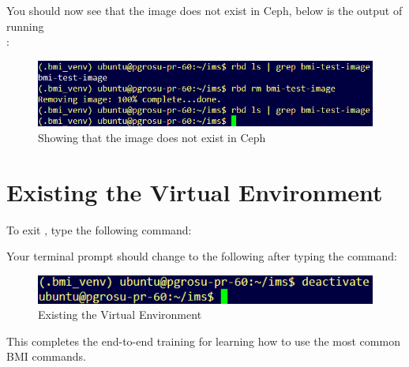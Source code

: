 You should now see that the image does not exist in Ceph, below is the output of running \\
: \\

\begin{figure}[!h] %
\label{fig:bmi-workflow}
\begin{center}
\includegraphics[scale=0.7]{figures/rbd-rm-bmi-test-image.png}
\end{center}
\caption{Showing that the image does not exist in Ceph}
\end{figure}

\section{Existing the Virtual Environment}

To exit , type the following command: 



Your terminal prompt should change to the following after typing the command: \\

\begin{figure}[!h] %
\label{fig:bmi-workflow}
\begin{center}
\includegraphics[scale=0.7]{figures/virtualenv-exit.png}
\end{center}
\caption{Existing the Virtual Environment }
\end{figure}


This completes the end-to-end training for learning how to use the most common BMI commands.

